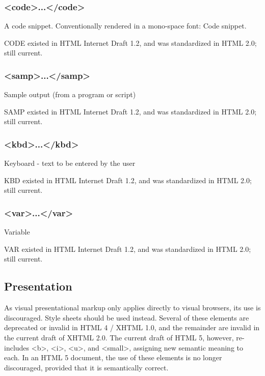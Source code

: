 \subsubsection{<code>...</code>}

A code snippet. Conventionally rendered in a mono-space font: Code snippet.

CODE existed in HTML Internet Draft 1.2, and was standardized in HTML 2.0; still current.


\subsubsection{<samp>...</samp>}

Sample output (from a program or script)

SAMP existed in HTML Internet Draft 1.2, and was standardized in HTML 2.0; still current.


\subsubsection{<kbd>...</kbd>}


Keyboard - text to be entered by the user

KBD existed in HTML Internet Draft 1.2, and was standardized in HTML 2.0; still current.


\subsubsection{<var>...</var>}


Variable

VAR existed in HTML Internet Draft 1.2, and was standardized in HTML 2.0; still current.





\subsection{Presentation}

As visual presentational markup only applies directly to visual browsers, its use is discouraged. Style sheets should be used instead. Several of these elements are deprecated or invalid in HTML 4 / XHTML 1.0, and the remainder are invalid in the current draft of XHTML 2.0. The current draft of HTML 5, however, re-includes <b>, <i>, <u>, and <small>, assigning new semantic meaning to each. In an HTML 5 document, the use of these elements is no longer discouraged, provided that it is semantically correct.


